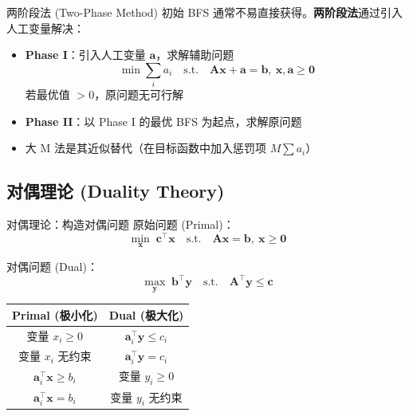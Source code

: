 \documentclass[11pt, aspectratio=169, svgnames, table, fontset=fandol]{ctexbeamer}
\begin{document}
\begin{frame}{两阶段法 (Two-Phase Method)}
  初始 BFS 通常不易直接获得。\textbf{两阶段法}通过引入人工变量解决：
  \begin{itemize}
    \item \textbf{Phase I}：引入人工变量 $\bm{a}$，求解辅助问题
      \begin{equation*}
        \min \sum_{i} a_i \quad \text{s.t.} \quad \bm{Ax} + \bm{a} = \bm{b},\ \bm{x}, \bm{a} \geq \bm{0}
      \end{equation*}
      若最优值 $>0$，原问题无可行解
    \item \textbf{Phase II}：以 Phase I 的最优 BFS 为起点，求解原问题
    \item 大 M 法是其近似替代（在目标函数中加入惩罚项 $M\sum a_i$）
  \end{itemize}
\end{frame}

\subsection{对偶理论 (Duality Theory)}

\begin{frame}{对偶理论：构造对偶问题}
  原始问题 (Primal)：
  \begin{equation*}
    \min_{\bm{x}} \;\bm{c}^\top \bm{x} \quad \text{s.t.} \quad \bm{Ax} = \bm{b},\ \bm{x} \geq \bm{0}
  \end{equation*}

  \vspace{6pt}
  对偶问题 (Dual)：
  \begin{equation*}
    \max_{\bm{y}} \;\bm{b}^\top \bm{y} \quad \text{s.t.} \quad \bm{A}^\top \bm{y} \leq \bm{c}
  \end{equation*}

  \vspace{8pt}
  \begin{table}
    \small
    \begin{tabular}{c|c}
      \toprule
      Primal (极小化) & Dual (极大化) \\
      \midrule
      变量 $x_i \geq 0$ & $\bm{a}_i^\top \bm{y} \leq c_i$ \\
      变量 $x_i$ 无约束 & $\bm{a}_i^\top \bm{y} = c_i$ \\
      $\bm{a}_i^\top \bm{x} \geq b_i$ & 变量 $y_i \geq 0$ \\
      $\bm{a}_i^\top \bm{x} = b_i$ & 变量 $y_i$ 无约束 \\
      \bottomrule
    \end{tabular}
  \end{table}
\end{frame}
\end{document}
